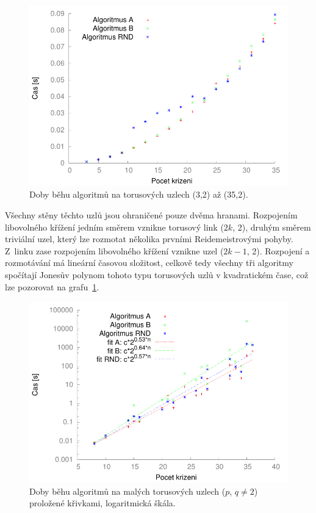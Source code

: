 \begin{figure}[b]\centering
\includegraphics{../img/torus2}
\caption{Doby běhu algoritmů na torusových uzlech (3,2) až (35,2).}
\label{obr03:torus2}
\end{figure}

Všechny stěny těchto uzlů jsou ohraničené pouze dvěma hranami. Rozpojením libovolného křížení jedním směrem vznikne torusový link ($2k$, 2), druhým směrem triviální uzel, který lze rozmotat několika prvními Reidemeistrovými pohyby. Z~linku zase rozpojením libovolného křížení vznikne uzel ($2k-1$, 2). Rozpojení a rozmotávání má lineární časovou složitost, celkově tedy všechny tři algoritmy spočítají Jonesův polynom tohoto typu torusových uzlů v kvadratickém čase, což lze pozorovat na grafu~\ref{obr03:torus2}.

\begin{figure}[p]\centering
\includegraphics{../img/torusNe2FIT}
\caption{Doby běhu algoritmů na malých torusových uzlech ($p$, $q\neq 2$) proložené křivkami, logaritmická škála.}
\label{obr03:torusFIT}
\end{figure}


